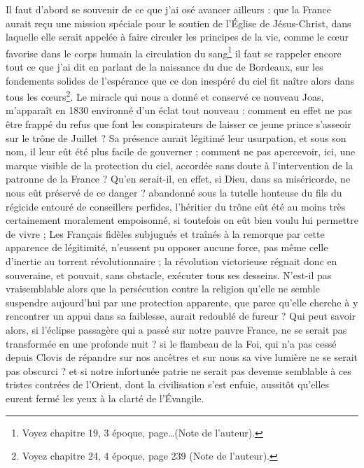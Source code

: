 \documentclass[11pt,a4paper]{report}
\begin{document}
Il faut d'abord se souvenir de ce que j'ai osé avancer ailleurs : que la France aurait reçu une mission spéciale pour le soutien de l'Église de Jésus-Christ, dans laquelle elle serait appelée à faire circuler les principes de la vie, comme le cœur favorise dans le corps humain la circulation du sang\footnote{Voyez chapitre 19, 3 époque, page\dots (Note de l'auteur).} il faut se rappeler encore tout ce que j'ai dit en parlant de la naissance du duc de Bordeaux, sur les fondements solides de l'espérance que ce don inespéré du ciel fit naître alors dans tous les cœurs\footnote{Voyez chapitre 24, 4 époque, page 239 (Note de l'auteur).}. Le miracle qui nous a donné et conservé ce nouveau Joas, m'apparaît en 1830 environné d'un éclat tout nouveau : comment en effet ne pas être frappé du refus que font les conspirateurs de laisser ce jeune prince s'asseoir sur le trône de Juillet ? Sa présence aurait légitimé leur usurpation, et sous son nom, il leur eût été plus facile de gouverner ; comment ne pas apercevoir, ici, une marque visible de la protection du ciel, accordée sans doute à l'intervention de la patronne de la France ? Qu'en serait-il, en effet, si Dieu, dans sa miséricorde, ne nous eût préservé de ce danger ? abandonné sous la tutelle honteuse du fils du régicide entouré de conseillers perfides, l'héritier du trône eût été au moins très certainement moralement empoisonné, si toutefois on eût bien voulu lui permettre de vivre ; Les Français fidèles subjugués et traînés à la remorque par cette apparence de légitimité, n'eussent pu opposer aucune force, pas même celle d'inertie au torrent révolutionnaire ; la révolution victorieuse régnait donc en souveraine, et pouvait, sans obstacle, exécuter tous ses desseins. N'est-il pas vraisemblable alors que la persécution contre la religion qu'elle ne semble suspendre aujourd'hui par une protection apparente, que parce qu'elle cherche à y rencontrer un appui dans sa faiblesse, aurait redoublé de fureur ? Qui peut savoir alors, si l'éclipse passagère qui a passé sur notre pauvre France, ne se serait pas transformée en une profonde nuit ? si le flambeau de la Foi, qui n'a pas cessé depuis Clovis de répandre sur nos ancêtres et sur nous sa vive lumière ne se serait pas obscurci ? et si notre infortunée patrie ne serait pas devenue semblable à ces tristes contrées de l'Orient, dont la civilisation s'est enfuie, aussitôt qu'elles eurent fermé les yeux à la clarté de l'Évangile.
\end{document}
